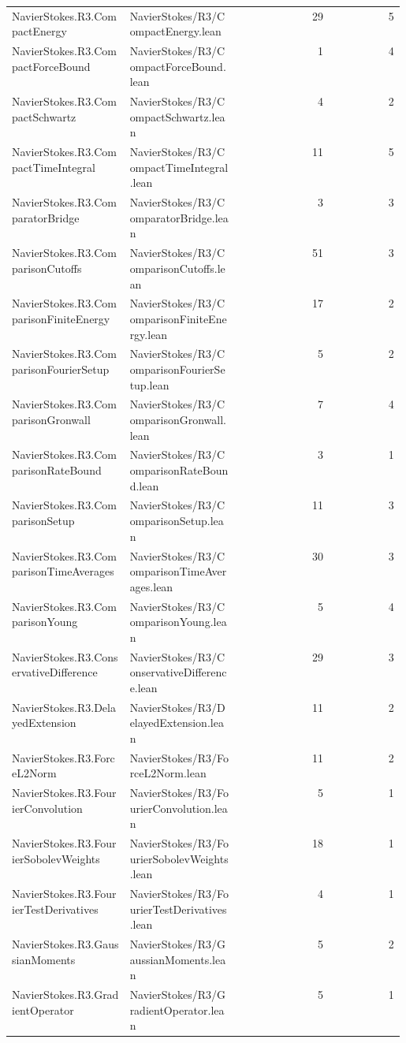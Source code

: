 \begin{longtable}{p{0.30\linewidth}p{0.28\linewidth}rr}
NavierStokes.R3.CompactEnergy & NavierStokes/R3/CompactEnergy.lean & 29 & 5\\
NavierStokes.R3.CompactForceBound & NavierStokes/R3/CompactForceBound.lean & 1 & 4\\
NavierStokes.R3.CompactSchwartz & NavierStokes/R3/CompactSchwartz.lean & 4 & 2\\
NavierStokes.R3.CompactTimeIntegral & NavierStokes/R3/CompactTimeIntegral.lean & 11 & 5\\
NavierStokes.R3.ComparatorBridge & NavierStokes/R3/ComparatorBridge.lean & 3 & 3\\
NavierStokes.R3.ComparisonCutoffs & NavierStokes/R3/ComparisonCutoffs.lean & 51 & 3\\
NavierStokes.R3.ComparisonFiniteEnergy & NavierStokes/R3/ComparisonFiniteEnergy.lean & 17 & 2\\
NavierStokes.R3.ComparisonFourierSetup & NavierStokes/R3/ComparisonFourierSetup.lean & 5 & 2\\
NavierStokes.R3.ComparisonGronwall & NavierStokes/R3/ComparisonGronwall.lean & 7 & 4\\
NavierStokes.R3.ComparisonRateBound & NavierStokes/R3/ComparisonRateBound.lean & 3 & 1\\
NavierStokes.R3.ComparisonSetup & NavierStokes/R3/ComparisonSetup.lean & 11 & 3\\
NavierStokes.R3.ComparisonTimeAverages & NavierStokes/R3/ComparisonTimeAverages.lean & 30 & 3\\
NavierStokes.R3.ComparisonYoung & NavierStokes/R3/ComparisonYoung.lean & 5 & 4\\
NavierStokes.R3.ConservativeDifference & NavierStokes/R3/ConservativeDifference.lean & 29 & 3\\
NavierStokes.R3.DelayedExtension & NavierStokes/R3/DelayedExtension.lean & 11 & 2\\
NavierStokes.R3.ForceL2Norm & NavierStokes/R3/ForceL2Norm.lean & 11 & 2\\
NavierStokes.R3.FourierConvolution & NavierStokes/R3/FourierConvolution.lean & 5 & 1\\
NavierStokes.R3.FourierSobolevWeights & NavierStokes/R3/FourierSobolevWeights.lean & 18 & 1\\
NavierStokes.R3.FourierTestDerivatives & NavierStokes/R3/FourierTestDerivatives.lean & 4 & 1\\
NavierStokes.R3.GaussianMoments & NavierStokes/R3/GaussianMoments.lean & 5 & 2\\
NavierStokes.R3.GradientOperator & NavierStokes/R3/GradientOperator.lean & 5 & 1\\

\end{longtable}
